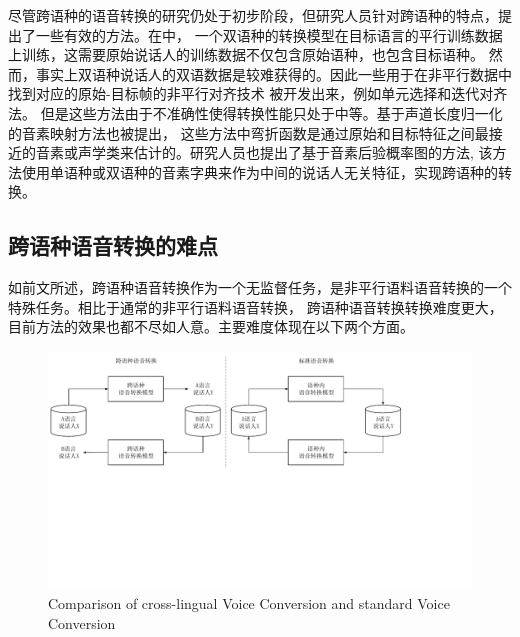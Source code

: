 尽管跨语种的语音转换的研究仍处于初步阶段，但研究人员针对跨语种的特点，提出了一些有效的方法。在\cite{AbeStatistical}中，
一个双语种的转换模型在目标语言的平行训练数据上训练，这需要原始说话人的训练数据不仅包含原始语种，也包含目标语种。
然而，事实上双语种说话人的双语数据是较难获得的。因此一些用于在非平行数据中找到对应的原始-目标帧的非平行对齐技术
被开发出来，例如单元选择\cite{sundermann2006text,Hao2015AA}和迭代对齐法\cite{erro2007frame,erro2009inca}。
但是这些方法由于不准确性使得转换性能只处于中等。基于声道长度归一化的音素映射方法也被提出\cite{sundermann2003vtln,qian2011frame}，
这些方法中弯折函数是通过原始和目标特征之间最接近的音素或声学类来估计的。研究人员也提出了基于音素后验概率图的方法\cite{sun2016personalized,zhou2019cross},
该方法使用单语种或双语种的音素字典来作为中间的说话人无关特征，实现跨语种的转换。

\subsection{跨语种语音转换的难点}
如前文所述，跨语种语音转换作为一个无监督任务，是非平行语料语音转换的一个特殊任务。相比于通常的非平行语料语音转换，
跨语种语音转换转换难度更大，目前方法的效果也都不尽如人意。主要难度体现在以下两个方面。

\begin{figure}[!htp]
    \centering
    \includegraphics[width=14cm,trim=0 200 80 0,clip]{figure/5_clvc.pdf}
    {Comparison of cross-lingual Voice Conversion and standard Voice Conversion}
    \label{fig:clvc}
\end{figure}

